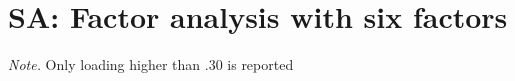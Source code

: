 \documentclass[
  english,
  man]{apa6}
\begin{document}
\begin{appendix}
\begin{center}
\begin{ThreePartTable}
\end{ThreePartTable}
\end{center}

\hypertarget{sa-factor-analysis-with-six-factors}{%
\section{SA: Factor analysis with six
factors}\label{sa-factor-analysis-with-six-factors}}

\begin{center}
\begin{ThreePartTable}

\begin{TableNotes}[para]
\normalsize{\textit{Note.} Only loading higher than .30 is reported}
\end{TableNotes}


\end{ThreePartTable}
\end{center}
\end{appendix}
\end{document}
